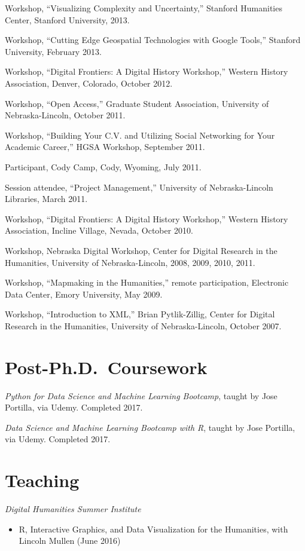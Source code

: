 Workshop, ``Visualizing Complexity and Uncertainty,'' Stanford
Humanities Center, Stanford University, 2013.

Workshop, ``Cutting Edge Geospatial Technologies with Google Tools,''
Stanford University, February 2013.

Workshop, ``Digital Frontiers: A Digital History Workshop,'' Western
History Association, Denver, Colorado, October 2012.

Workshop, ``Open Access,'' Graduate Student Association, University of
Nebraska-Lincoln, October 2011.

Workshop, ``Building Your C.V. and Utilizing Social Networking for Your
Academic Career,'' HGSA Workshop, September 2011.

Participant, Cody Camp, Cody, Wyoming, July 2011.

Session attendee, ``Project Management,'' University of Nebraska-Lincoln
Libraries, March 2011.

Workshop, ``Digital Frontiers: A Digital History Workshop,'' Western
History Association, Incline Village, Nevada, October 2010.

Workshop, Nebraska Digital Workshop, Center for Digital Research in the
Humanities, University of Nebraska-Lincoln, 2008, 2009, 2010, 2011.

Workshop, ``Mapmaking in the Humanities,'' remote participation,
Electronic Data Center, Emory University, May 2009.

Workshop, ``Introduction to XML,'' Brian Pytlik-Zillig, Center for
Digital Research in the Humanities, University of Nebraska-Lincoln,
October 2007.

\section{Post-Ph.D.~Coursework}\label{post-ph.d.coursework}

\emph{Python for Data Science and Machine Learning Bootcamp}, taught by
Jose Portilla, via Udemy. Completed 2017.

\emph{Data Science and Machine Learning Bootcamp with R}, taught by Jose
Portilla, via Udemy. Completed 2017.

\section{Teaching}\label{teaching}

\emph{Digital Humanities Summer Institute}

\begin{itemize}
\tightlist
\item
  R, Interactive Graphics, and Data Visualization for the Humanities,
  with Lincoln Mullen (June 2016)
\end{itemize}

